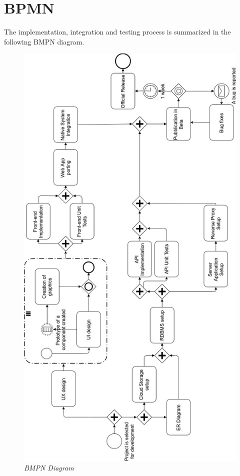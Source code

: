 \newpage
\section{BPMN}
The implementation, integration and testing process is summarized in the following BMPN diagram.

\begin{figure}[H]
  \centering
  \includegraphics[origin=c,width=\textwidth,height=.862\textheight,keepaspectratio]{DD_Images/DevelopmentBPMN.jpg}
  \caption{\textit{BMPN Diagram}}
\end{figure}